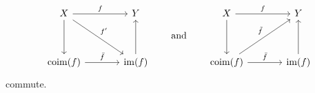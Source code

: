 \begin{lemma}
\begin{enumerate}
\begin{equation}
        \label{compatibility of induced morphisms}
        \begin{tikzcd}[column sep = large, row sep = huge]
            X
            \arrow{r}[above]{f}
            \arrow{dr}[above right]{f'}
            \arrow{d}
          & Y
          \\
            \coim(f)
            \arrow{r}[above]{\bar{f}}
          & \im(f)
            \arrow{u}
        \end{tikzcd}
        \qquad\text{and}\qquad
        \begin{tikzcd}[column sep = large, row sep = huge]
            X
            \arrow{r}[above]{f}
            \arrow{d}
          & Y
          \\
            \coim(f)
            \arrow{r}[above]{\bar{f}}
            \arrow{ur}[above left]{\tilde{f}}
          & \im(f)
            \arrow{u}
        \end{tikzcd}
      \end{equation}
      commute.
  \end{enumerate}
\end{lemma}


